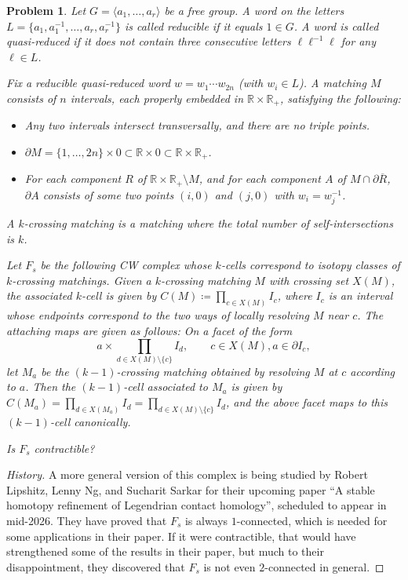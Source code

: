 \documentclass{amsart}
\newtheorem*{problem*}{Problem}
\newcommand{\RR}{\mathbb{R}}
\newcommand{\defeq}{\coloneqq}
\newcommand{\bdy}{\partial}
\begin{document}
\begin{problem*}
  Let $G=\langle a_1,\dots,a_r\rangle$ be a free group. A word on the
  letters $L=\{a_1,a_1^{-1},\dots,a_r,a_r^{-1}\}$ is called reducible
  if it equals $1\in G$. A word is called quasi-reduced if it does not
  contain three consecutive letters $\ell\ell^{-1}\ell$ for any
  $\ell \in L$.

  Fix a reducible quasi-reduced word $w=w_1\cdots w_{2n}$ (with $w_i\in L$). A
  matching $M$ consists of $n$ intervals, each properly embedded in
  $\RR\times\RR_+$, satisfying the following:
  \begin{itemize}[leftmargin=*]
  \item Any two intervals intersect
    transversally, and there are no triple points.
  \item $\bdy M=\{1,\dots,2n\}\times 0\subset\RR\times 0\subset
    \RR\times\RR_+$.
  \item For each component $R$ of
    $\RR\times\RR_+\setminus M$, and for each component $A$ of $M\cap \bdy\overline{R}$, $\bdy A$ consists of some two points $(i,0)$ and $(j,0)$ with $w_i=w_j^{-1}$. 
  \end{itemize}
  A $k$-crossing
  matching is a matching where the total number of self-intersections
  is $k$.

  Let $F_s$ be the following CW complex whose $k$-cells correspond to
  isotopy classes of $k$-crossing matchings. Given a $k$-crossing
  matching $M$ with crossing set $X(M)$, the associated $k$-cell is
  given by $C(M)\defeq \prod_{c\in X(M)}I_c$, where $I_c$ is an
  interval whose endpoints correspond to the two ways of locally
  resolving $M$ near $c$. The attaching maps are given as follows: On
  a facet of the form
  \[
    a\times\prod_{d\in X(M)\setminus\{c\}}I_{d},\qquad c\in X(M),a\in \bdy I_c,
  \]
  let $M_a$ be the $(k-1)$-crossing matching obtained by resolving $M$
  at $c$ according to $a$. Then the $(k-1)$-cell associated to $M_a$
  is given by
  $C(M_a)=\prod_{d\in X(M_a)}I_d=\prod_{d\in X(M)\setminus\{c\}}I_{d}$, and the
  above facet maps to this $(k-1)$-cell canonically.

  Is $F_s$ contractible?
  \end{problem*}

\begin{proof}[History]
  \renewcommand{\qedsymbol}{} A more general version of this complex
  is being studied by Robert Lipshitz, Lenny Ng, and Sucharit Sarkar
  for their upcoming paper ``A stable homotopy refinement of
  Legendrian contact homology'', scheduled to appear in mid-2026. They
  have proved that $F_s$ is always $1$-connected, which is needed for
  some applications in their paper. If it were contractible, that
  would have strengthened some of the results in their paper, but much
  to their disappointment, they discovered that $F_s$ is not even
  $2$-connected in general.
\end{proof}
\end{document}
